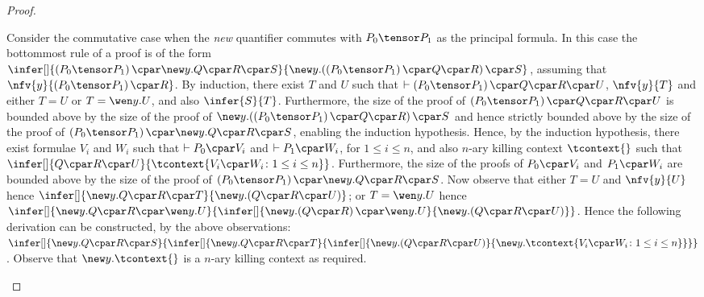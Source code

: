 \begin{proof}
\begin{enumerate}[label=\textbf{\Alph*},ref=\Alph*,leftmargin=*]
{Consider the commutative case when the \textit{new} quantifier commutes with $P_0 \tensor P_1$ as the principal formula.
In this case the bottommost rule of a proof is of the form $
\infer[]{
\left( P_0 \tensor P_1 \right) \cpar \new y. Q \cpar R \cpar S
}{
\mathopen{\new y.} \left( \left( P_0 \tensor P_1 \right) \cpar Q \cpar R\right) \cpar S
}$,
assuming that $\nfv{y}{\left( P_0 \tensor P_1 \right) \cpar R}$.
By induction, there exist $T$ and $U$ such that $\vdash \left( P_0 \tensor P_1 \right) \cpar Q \cpar R \cpar U$, $\nfv{y}{T}$ and either $T = U$ or $T = \wen y. U$, and also
$\infer{S}{T}$.
Furthermore, the size of the proof of $\left( P_0 \tensor P_1 \right) \cpar Q \cpar R \cpar U$ is bounded above by the size of the proof of $\mathopen{\new y.} \left( \left( P_0 \tensor P_1 \right) \cpar Q \cpar R\right) \cpar S$ and hence strictly bounded above by the size of the proof of $\left( P_0 \tensor P_1 \right) \cpar \new y. Q \cpar R \cpar S$, enabling the induction hypothesis.
Hence, by the induction hypothesis, there exist formulae $V_i$ and $W_i$ such that $\vdash P_0 \cpar V_i$ and $\vdash P_1 \cpar W_i$, for $1 \leq i \leq n$, and also $n$-ary killing context $\tcontext{}$ such that
$
\infer[]{
Q \cpar R \cpar U 
}{
\tcontext{ V_i \cpar W_i \colon 1 \leq i \leq n }
}$.
Furthermore, the size of the proofs of $P_0 \cpar V_i$ and $P_1 \cpar W_i$ are bounded above by the size of the proof of $\left( P_0 \tensor P_1 \right) \cpar \new y. Q \cpar R \cpar S$.
Now observe that either $T = U$ and $\nfv{y}{U}$ hence
$\infer[]{
\new y. Q \cpar R \cpar T
}{
 \mathopen{\new y.} \left(Q \cpar R \cpar U\right)
}$;
or $T = \wen y. U$ hence $
\infer[]{
\new y. Q \cpar R \cpar \wen y. U
}{
\infer[]{
 \mathopen{\new y.} \left(Q \cpar R\right) \cpar \wen y. U
}{
 \mathopen{\new y.} \left(Q \cpar R \cpar U\right)
}}$.
Hence the following derivation can be constructed, by the above observations:
$
\infer[]{
\new y. Q \cpar R \cpar S
}{
\infer[]{
\new y. Q \cpar R \cpar T
}{
\infer[]{
\mathopen{\new y.} \left( Q \cpar R \cpar U \right)
}{
\new y. \tcontext{ V_i \cpar W_i \colon 1 \leq i \leq n }
}}}
$.
Observe that $\new y. \tcontext{ }$ is a $n$-ary killing context as required.
\smallskip


}
\end{enumerate}
\end{proof}
